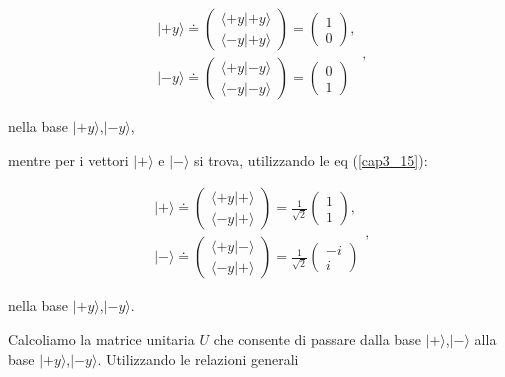\documentclass[a4paper,12pt,oneside]{book}
\begin{document}
\begin{equation}
\begin{array}{c}
| +y \rangle \doteq 
\begin{pmatrix}
\langle +y | +y \rangle\\
\langle -y | +y \rangle
\end{pmatrix}=
\begin{pmatrix}
1\\
0
\end{pmatrix}, \\
| -y \rangle \doteq 
\begin{pmatrix}
\langle +y | -y \rangle\\
\langle -y | -y \rangle
\end{pmatrix}=
\begin{pmatrix}
0\\
1
\end{pmatrix}
\end{array} ,
\end{equation}

nella base $| +y \rangle $,$| -y \rangle$, 

mentre per i vettori $| + \rangle $ e $| - \rangle$ si trova, utilizzando le eq (\ref{cap3_15}):

\begin{equation}
\begin{array}{c}
| + \rangle \doteq 
\begin{pmatrix}
\langle +y | + \rangle\\
\langle -y | + \rangle
\end{pmatrix}=
\frac{1}{\sqrt{2}}
\begin{pmatrix}
1\\
1
\end{pmatrix} ,\\
| - \rangle \doteq 
\begin{pmatrix}
\langle +y | - \rangle\\
\langle -y | + \rangle
\end{pmatrix}=
\frac{1}{\sqrt{2}}
\begin{pmatrix}
-i\\
i
\end{pmatrix}
\end{array} ,
\label{cap3_16}
\end{equation}

nella base $| +y \rangle $,$| -y \rangle$.

Calcoliamo la matrice unitaria $U$ che consente di passare dalla base $| + \rangle $,$| - \rangle $ alla base $| +y \rangle $,$| -y \rangle$. Utilizzando le relazioni generali
\end{document}
